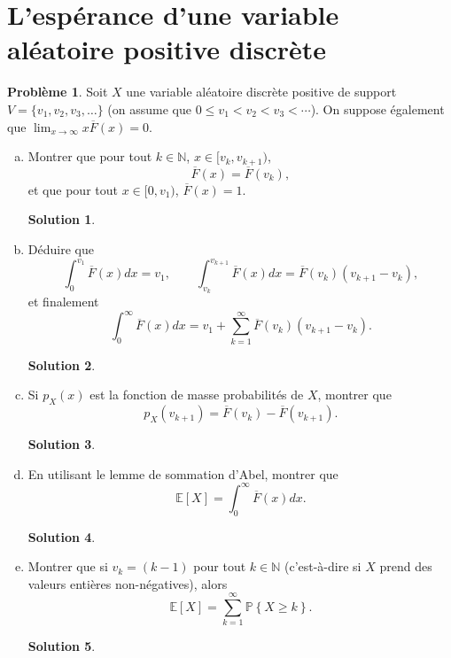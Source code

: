 \documentclass[11pt]{amsart}
\theoremstyle{definition}
\newtheorem{probleme}{Problème}
\newtheorem*{solution}{Solution}
\theoremstyle{remark}
\numberwithin{equation}{section}
\newcommand{\N} {\mathbb{N}}
\newcommand{\PR} {\mathbb P}
\newcommand{\ES} {\mathbb E}
\newcommand{\ac}[1]{\left\{ #1 \right\}} %
\newcommand{\ct}[1]{\left[ #1 \right]} %
\newcommand \1 {\mathbbm 1}
\begin{document}
	\section{L'espérance d'une variable aléatoire positive discrète}
		
	\begin{probleme}
		Soit $X$ une variable aléatoire discrète positive de support $V = \{ v_1, v_2, v_3, \dots\}$ (on assume que $0 \leq v_1 < v_2 < v_3 < \cdots$). On suppose également que $\lim_{x \to \infty} x \overline F(x) = 0$.
		
		\begin{enumerate}[(a)]
			\item Montrer que pour tout $k \in\N$, $x \in [v_k, v_{k+1})$,
			$$ \overline F (x) = \overline F(v_k),$$
			et que pour tout $x \in [0, v_1)$, $\overline F(x) = 1$.
		
		\begin{solution}
		\end{solution}
		\vspace{0.3cm}
		
			
			\item Déduire que
			$$\int_0^{v_1} \overline F(x) dx = v_1,\qquad \int_{v_k}^{v_{k+1}} \overline F(x) dx = \overline F(v_k) (v_{k+1} - v_k),$$
			et finalement
			$$\int_0^\infty \overline F (x) dx = v_1 + \sum_{k=1}^\infty \overline F(v_k) (v_{k+1} - v_k).$$
		
		\begin{solution}
		\end{solution}
		\vspace{0.3cm}
		
			
			
			\item Si $p_X (x)$ est la fonction de masse probabilités de $X$, montrer que
			$$p_X (v_{k+1}) = \overline F (v_k) - \overline F (v_{k+1}).$$
		
		\begin{solution}
		\end{solution}
		\vspace{0.3cm}
		
			
			
			\item En utilisant le lemme de sommation d'Abel, montrer que
			$$\ES \ct{X} = \int_0^\infty \overline F(x) dx.$$
		
		\begin{solution}
		\end{solution}
		\vspace{0.3cm}
		
			
			\item Montrer que si $v_k = (k-1)$ pour tout $k \in \N$ (c'est-à-dire si $X$ prend des valeurs entières non-négatives), alors
			$$\ES \ct{X} = \sum_{k=1}^\infty \PR \ac{X \geq k}.$$
		
		\begin{solution}
		\end{solution}
		\vspace{0.3cm}
		
		\end{enumerate}
	\end{probleme}
\end{document}
